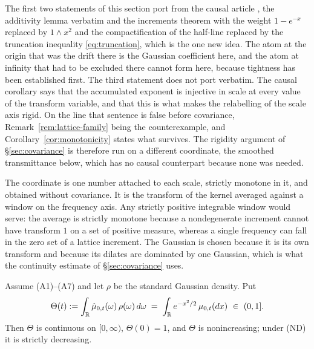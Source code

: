 \begin{remark}\label{rem:causal-relation-cascade}
The first two statements of this section port from the causal article
, the additivity lemma verbatim and the increments theorem
with the weight $1 - e^{-x}$ replaced by $1 \wedge x^2$ and the compactification of the
half-line replaced by the truncation inequality \ref{eq:truncation}, which is the one new
idea. The atom at the origin that was the drift there is the Gaussian coefficient here, and
the atom at infinity that had to be excluded there cannot form here, because tightness has been
established first. The third statement does not port verbatim.
The causal corollary says that the accumulated exponent is injective in scale at every
value of the transform variable, and that this is what makes the relabelling of the scale
axis rigid. On the line that sentence is false before covariance,
Remark~\ref{rem:lattice-family} being the counterexample, and
Corollary~\ref{cor:monotonicity} states what survives. The rigidity argument of
\S\ref{sec:covariance} is therefore run on a different coordinate, the smoothed
transmittance below, which has no causal counterpart because none was needed.
\end{remark}

The coordinate is one number attached to each scale, strictly monotone in it, and obtained
without covariance. It is the transform of the kernel averaged against a window on the
frequency axis. Any strictly positive integrable window would serve: the average is
strictly monotone because a nondegenerate increment cannot have transform $1$ on a set of
positive measure, whereas a single frequency can fall in the zero set of a lattice
increment. The Gaussian is chosen because it is its own transform and because its dilates
are dominated by one Gaussian, which is what the continuity estimate of
\S\ref{sec:covariance} uses.

\begin{corollary}\label{cor:smoothed-transmittance}
Assume (A1)--(A7) and let $\rho$ be the standard Gaussian density. Put
\[
  \Theta(t) := \int_{\mathbb{R}} \hat\mu_{0,t}(\omega)\,\rho(\omega)\,d\omega
   \;=\; \int_{\mathbb{R}} e^{-x^2/2}\,\mu_{0,t}(dx) \ \in\ (0,1].
\]
Then $\Theta$ is continuous on $[0,\infty)$, $\Theta(0) = 1$, and $\Theta$ is nonincreasing;
under (ND) it is strictly decreasing.
\end{corollary}

